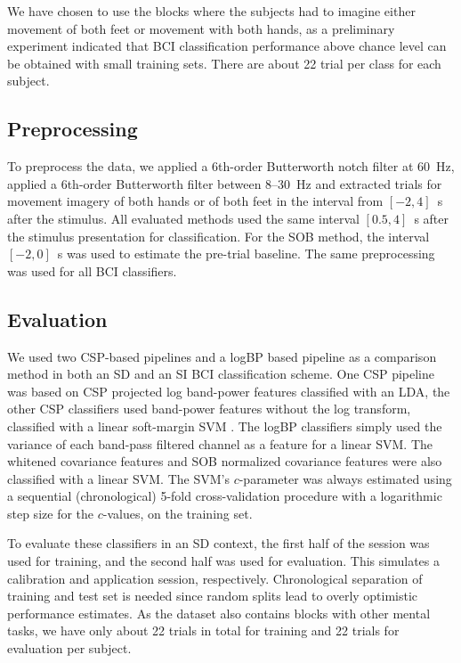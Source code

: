 \begin{sloppypar}
We have chosen to use the blocks where the subjects had to imagine either
movement of both feet or movement with both hands, as a preliminary experiment
indicated that \ac{BCI} classification performance above chance level can be
obtained with small training sets. There are about 22 trial per class for each
subject.
\end{sloppypar}

\subsection{Preprocessing}
To preprocess the data, we applied a 6th-order Butterworth notch filter at
60~Hz, applied a 6th-order Butterworth filter between 8--30~Hz and extracted
trials for movement imagery of both hands or of both feet in the interval from
$[-2, 4]$~s after the stimulus. 
%
All evaluated methods used the same interval $[0.5, 4]$~s after the stimulus
presentation for classification. For the \ac{SOB} method, the interval $[-2,
0]$~s was used to estimate the pre-trial baseline. The same preprocessing was
used for all \ac{BCI} classifiers.

\subsection{Evaluation}
\begin{sloppypar}
We used two \ac{CSP}-based pipelines and a \ac{logBP} based pipeline as a
comparison method in both an \ac{SD} and an \ac{SI} \ac{BCI} classification
scheme. One \ac{CSP} pipeline was based on \ac{CSP} projected log band-power
features classified with an \ac{LDA}, the other \ac{CSP} classifiers used
band-power features without the log transform, classified with a linear
soft-margin \ac{SVM} \cite{cortes1995svn}. The \ac{logBP} classifiers simply
used the variance of each band-pass filtered channel as a feature for a linear
\ac{SVM}. The whitened covariance features and \ac{SOB} normalized covariance
features were also classified with a linear \ac{SVM}. The \ac{SVM}'s
$c$-parameter was always estimated using a sequential (chronological) 5-fold
cross-validation procedure with a logarithmic step size for the $c$-values, on
the training set.
\end{sloppypar}

To evaluate these classifiers in an \ac{SD} context, the first half of the
session was used for training, and the second half was used for evaluation.
This simulates a calibration and application session, respectively.
Chronological separation of training and test set is needed since random splits
lead to overly optimistic performance estimates. As the dataset also
contains blocks with other mental tasks, we have only about 22 trials in total
for training and 22 trials for evaluation per subject.

